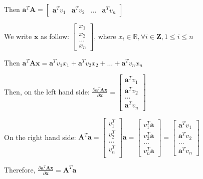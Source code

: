 \documentclass[12pt]{article}
\newcommand{\Rbb}{\mathbb{R}}
\newcommand{\Z}{\mathbf{Z}}
\begin{document}
\begin{enumerate}
\begin{enumerate}
            Then $\pmb{a}^T\pmb{A} = 
            \begin{bmatrix}
                \pmb{a}^Tv_1 & \pmb{a}^Tv_2 & \dots &\pmb{a}^Tv_n
            \end{bmatrix}$

            We write $\pmb{x}$ as follow:
            $\begin{bmatrix}
                x_1 \\
                x_2 \\
                \dots \\
                x_n
            \end{bmatrix}$, where $x_i \in \Rbb, \forall i \in \Z, 1\le i \le n$

            Then $\pmb{a}^T\pmb{Ax} = 
                \pmb{a}^Tv_1x_1 + \pmb{a}^Tv_2x_2 + \dots + \pmb{a}^Tv_nx_n$

            Then, on the left hand side: $\frac{\partial \pmb{a}^T\pmb{Ax}}{\partial \pmb{x}} = 
            \begin{bmatrix}
                \pmb{a}^Tv_1 \\ \pmb{a}^Tv_2 \\ \dots \\ \pmb{a}^Tv_n
            \end{bmatrix}$

            On the right hand side: $\pmb{A}^T\pmb{a} = \begin{bmatrix}
                v_1^T \\
                v_2^T \\
                \dots \\
                v_n^T \\
            \end{bmatrix} \pmb{a} =
            \begin{bmatrix}
                v_1^T\pmb{a} \\
                v_2^T\pmb{a} \\
                \dots \\
                v_n^T\pmb{a}
            \end{bmatrix} = 
            \begin{bmatrix}
                \pmb{a}^Tv_1 \\ \pmb{a}^Tv_2 \\ \dots \\ \pmb{a}^Tv_n
            \end{bmatrix}
            $

            Therefore, $\frac{\partial \pmb{a}^T\pmb{Ax}}{\partial \pmb{x}} = \pmb{A}^T\pmb{a}$
            

\end{enumerate}
\end{enumerate}
\end{document}
